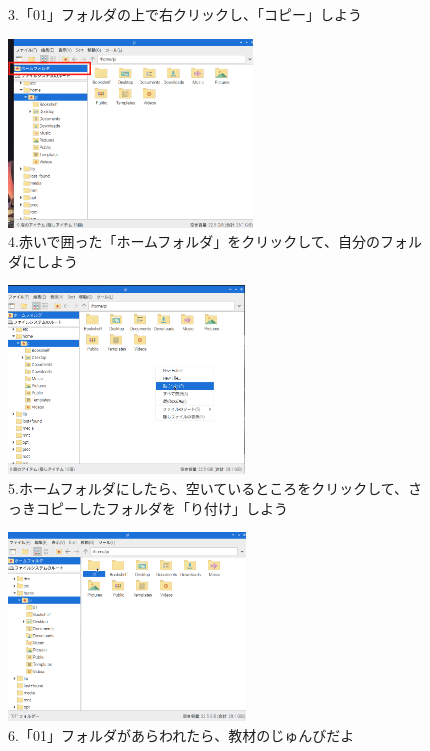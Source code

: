 \documentclass[a4paper,12pt]{jarticle}
\begin{document}
\begin{figure}
\begin{minipage}{\textwidth}
\begin{minipage}{0.45\linewidth}
      3.「01」フォルダの上で右クリックし、「コピー」しよう
    \end{minipage}
    \hfill
    \vspace{20pt}
    \begin{minipage}{0.45\linewidth}
      \includegraphics[height=5cm]{textbook-img1013.png}\\
      4.赤いで囲った「ホームフォルダ」をクリックして、自分のフォルダにしよう
    \end{minipage}    \begin{minipage}{0.45\linewidth}
      \includegraphics[height=5cm]{textbook-img1014.png}\\
      5.ホームフォルダにしたら、空いているところをクリックして、さっきコピーしたフォルダを「り付け」しよう
    \end{minipage}
    \hfill
    \vspace{20pt}
    \begin{minipage}{0.45\linewidth}
      \includegraphics[height=5cm]{textbook-img1015.png}\\
      6.「01」フォルダがあらわれたら、教材のじゅんびだよ
    \end{minipage}

  \end{minipage}

  \bigskip

\end{figure}
\end{document}

